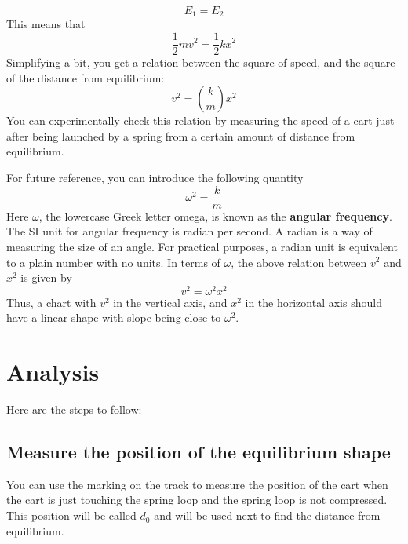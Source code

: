 \begin{equation}
    E_{1} = E_{2}
\end{equation}
This means that
\begin{equation}
    \frac{1}{2} m v^{2} = \frac{1}{2} k x^{2}
\end{equation}
Simplifying a bit, you get a relation between the square of speed, and the square of the distance from equilibrium:
\begin{equation}
    v^{2} = \left( \frac{k}{m} \right) x^{2}
\end{equation}
You can experimentally check this relation by measuring the speed of a cart just after being launched by a spring from a certain amount of distance from equilibrium.

For future reference, you can introduce the following quantity
\begin{equation}
    \omega^{2} = \frac{k}{m}
\end{equation}
Here $\omega$, the lowercase Greek letter omega, is known as the \textbf{angular frequency}. The SI unit for angular frequency is radian per second. A radian is a way of measuring the size of an angle. For practical purposes, a radian unit is equivalent to a plain number with no units. In terms of $\omega$, the above relation between $v^{2}$ and $x^{2}$ is given by
\begin{equation}
    v^{2} = \omega^{2} x^{2}
\end{equation}
Thus, a chart with $v^{2}$ in the vertical axis, and $x^{2}$ in the horizontal axis should have a linear shape with slope being close to $\omega^{2}$.
\section{Analysis}
Here are the steps to follow:
\subsection{Measure the position of the equilibrium shape}
You can use the marking on the track to measure the position of the cart when the cart is just touching the spring loop and the spring loop is not compressed. This position will be called $d_{0}$ and will be used next to find the distance from equilibrium.
